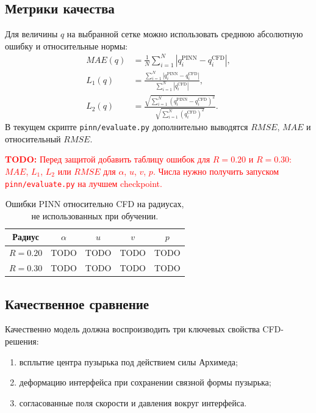 \documentclass[12pt,a4paper]{article}
\newcommand{\todo}[1]{%
    \par\noindent\textcolor{red}{\textbf{TODO:} #1}\par
}
\begin{document}
\subsection{Метрики качества}

Для величины \(q\) на выбранной сетке можно использовать среднюю абсолютную
ошибку и относительные нормы:
\begin{align}
    MAE(q)
    &=
    \frac{1}{N}\sum_{i=1}^{N}|q_i^{\mathrm{PINN}}-q_i^{\mathrm{CFD}}|,\\
    L_1(q)
    &=
    \frac{\sum_{i=1}^{N}|q_i^{\mathrm{PINN}}-q_i^{\mathrm{CFD}}|}
         {\sum_{i=1}^{N}|q_i^{\mathrm{CFD}}|},\\
    L_2(q)
    &=
    \frac{\sqrt{\sum_{i=1}^{N}(q_i^{\mathrm{PINN}}-q_i^{\mathrm{CFD}})^2}}
         {\sqrt{\sum_{i=1}^{N}(q_i^{\mathrm{CFD}})^2}}.
\end{align}
В текущем скрипте \texttt{pinn/evaluate.py} дополнительно выводятся \(RMSE\),
\(MAE\) и относительный \(RMSE\).

\todo{Перед защитой добавить таблицу ошибок для \(R=0.20\) и \(R=0.30\):
\(MAE\), \(L_1\), \(L_2\) или \(RMSE\) для \(\alpha\), \(u\), \(v\), \(p\).
Числа нужно получить запуском \texttt{pinn/evaluate.py} на лучшем checkpoint.}

\begin{table}[h]
    \centering
    \begin{tabular}{c|cccc}
        \hline
        Радиус & \(\alpha\) & \(u\) & \(v\) & \(p\) \\
        \hline
        \(R=0.20\) & TODO & TODO & TODO & TODO \\
        \(R=0.30\) & TODO & TODO & TODO & TODO \\
        \hline
    \end{tabular}
    \caption{Ошибки PINN относительно CFD на радиусах, не использованных при обучении.}
    \label{tab:test_errors}
\end{table}

\subsection{Качественное сравнение}

Качественно модель должна воспроизводить три ключевых свойства CFD-решения:
\begin{enumerate}
    \item всплытие центра пузырька под действием силы Архимеда;
    \item деформацию интерфейса при сохранении связной формы пузырька;
    \item согласованные поля скорости и давления вокруг интерфейса.
\end{enumerate}
\end{document}

